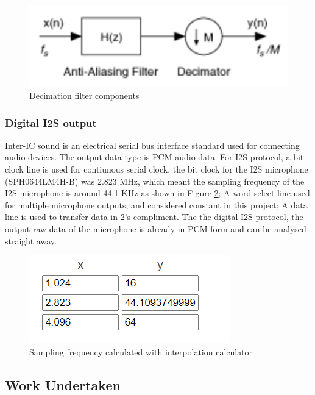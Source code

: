 \begin{figure}[H]
	\centering
	\noindent\includegraphics[width=.6\textwidth]{images/decimation.png}
	\caption{Decimation filter components}
	\label{fig:decimation}
\end{figure}

\subsubsection{Digital I2S output}
Inter-IC sound \cite{I2S} is an electrical serial bus interface standard used for connecting audio devices. The output data type is PCM audio data. For I2S protocol, a bit clock line is used for contiunous serial clock, the bit clock for the I2S microphone (SPH0644LM4H-B) was 2.823 MHz, which meant the sampling frequency of the I2S microphone is around 44.1 KHz as shown in Figure \ref{fig:I2Sfreq}; A word select line used for multiple microphone outputs, and considered constant in this project; A data line is used to transfer data in 2's compliment. The the digital I2S protocol, the output raw data of the microphone is already in PCM form and can be analysed straight away.
\begin{figure}[H]
	\centering
	\noindent\includegraphics[width=.6\textwidth]{images/I2Sfreq.png}
	\caption{Sampling frequency calculated with interpolation calculator}
	\label{fig:I2Sfreq}
\end{figure}



\subsection{Work Undertaken}
